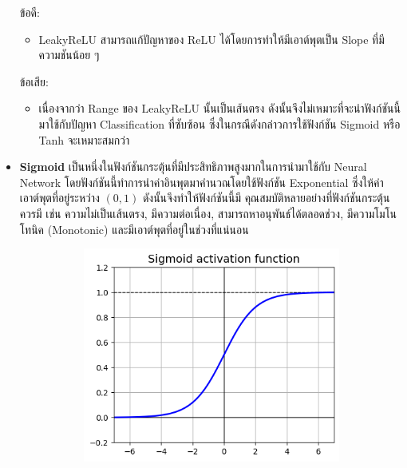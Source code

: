 \begin{itemize}
          ข้อดี:
          \begin{itemize}
              \item LeakyReLU สามารถแก้ปัญหาของ ReLU ได้โดยการทำให้มีเอาต์พุตเป็น Slope ที่มีความชันน้อย ๆ
          \end{itemize}
          ข้อเสีย:
          \begin{itemize}
              \item เนื่องจากว่า Range ของ LeakyReLU นั้นเป็นเส้นตรง ดังนั้นจึงไม่เหมาะที่จะนำฟังก์ชันนี้มาใช้กับปัญหา Classification
                    ที่ซับซ้อน ซึ่งในกรณีดังกล่าวการใช้ฟังก์ชัน Sigmoid หรือ Tanh จะเหมาะสมกว่า
          \end{itemize}

    \item \textbf{Sigmoid}\autocite{wilson1972} เป็นหนึ่งในฟังก์ชันกระตุ้นที่มีประสิทธิภาพสูงมากในการนำมาใช้กับ Neural Network
          โดยฟังก์ชันนี้ทำการนำค่าอินพุตมาคำนวณโดยใช้ฟังก์ชัน Exponential ซึ่งให้ค่าเอาต์พุตที่อยู่ระหว่าง $(0, 1)$ ดังนั้นจึงทำให้ฟังก์ชันนี้มี%
          คุณสมบัติหลายอย่างที่ฟังก์ชันกระตุ้นควรมี เช่น ความไม่เป็นเส้นตรง, มีความต่อเนื่อง, สามารถหาอนุพันธ์ได้ตลอดช่วง, มีความโมโนโทนิค
          (Monotonic) และมีเอาต์พุตที่อยู่ในช่วงที่แน่นอน
          \begin{figure}[H]
              \centering
              \begin{subfigure}{0.5\textwidth}
                  \centering
                  \includegraphics[width=0.9\linewidth]{fig/actfunc_sigmoid.png}
                  \caption{%
                      \begin{equation}

\end{equation}}
\end{subfigure}
\end{figure}
\end{itemize}
